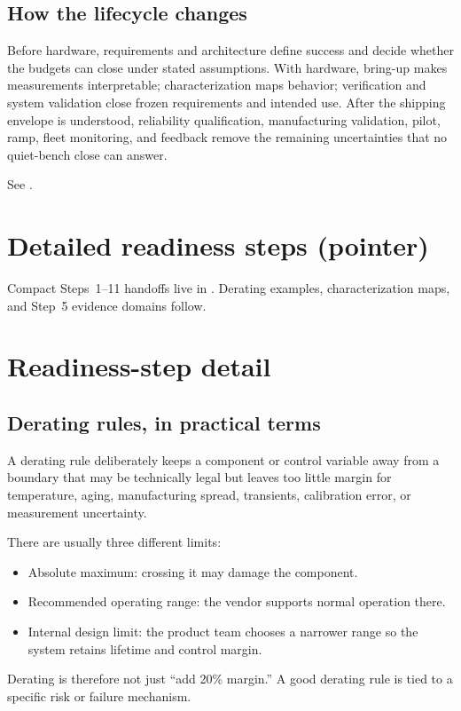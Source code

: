 \subsection{How the lifecycle changes}

Before hardware, requirements and architecture define success and decide whether
the budgets can close under stated assumptions. With hardware, bring-up makes
measurements interpretable; characterization maps behavior; verification and
system validation close frozen requirements and intended use. After the shipping
envelope is understood, reliability qualification, manufacturing validation,
pilot, ramp, fleet monitoring, and feedback remove the remaining uncertainties
that no quiet-bench close can answer.

See .


\section{Detailed readiness steps (pointer)}
\label{sec:readiness-steps-pointer}
Compact Steps~1--11 handoffs live in
. Derating examples,
characterization maps, and Step~5 evidence domains follow.

\section{Readiness-step detail}
\label{sec:readiness-steps-detail}

\subsection{Derating rules, in practical terms}
\label{sec:derating-rules}

A derating rule deliberately keeps a component or control variable away from a
boundary that may be technically legal but leaves too little margin for
temperature, aging, manufacturing spread, transients, calibration error, or
measurement uncertainty.

There are usually three different limits:
\begin{itemize}
\item Absolute maximum: crossing it may damage the component.
\item Recommended operating range: the vendor supports normal operation there.
\item Internal design limit: the product team chooses a narrower range so the
      system retains lifetime and control margin.
\end{itemize}
Derating is therefore not just ``add 20\% margin.'' A good derating rule is tied
to a specific risk or failure mechanism.

